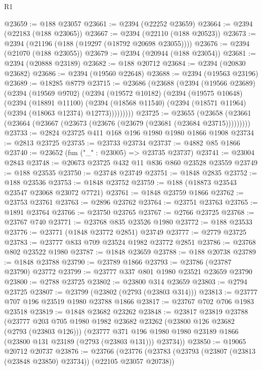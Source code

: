 \begin{lexlean}{R1}
\begin{coremodule}
@23659 := @188 @23057
@23661 := @2394 (@22252 @23659)
@23664 := @2394 (@22183 (@188 @23065))
@23667 := @2394 (@22110 (@188 @20523))
@23673 := @2394 (@21196 (@188 (@19297 (@18792 @20698 @23055))))
@23676 := @2394 (@21070 (@188 @23055))
@23679 := @2394 (@20944 (@188 @23054))
@23681 := @2394 (@20888 @23189)
@23682 := @188 @20712
@23684 := @2394 (@20830 @23682)
@23686 := @2394 (@19560 @22648)
@23688 := @2394 (@19563 @23196)
@23689 := @18285 @8779
@23715 := @23686
    (@23688
      (@2394
        (@19566 @23689)
        (@2394
          (@19569 @9702)
          (@2394
            (@19572 @10182)
            (@2394
              (@19575 @10648)
              (@2394
                (@18891 @11100)
                (@2394 (@18568 @11540) (@2394 (@18571 @11964) (@2394 (@18063 @12374) @12773)))))))))
@23725 := @23655
    (@23658 (@23661 (@23664 (@23667 (@23673 (@23676 (@23679 (@23681 (@23684 @23715)))))))))
@23733 := @2824 @23725 @411 @168 @196 @1980 @1980 @1866 @1908
@23734 := @2813 @23725
@23735 := @23733 @23734
@23737 := @4882 @85 @1866
@23740 := @23652 (fun ("_" : @23005) => @23735 @23737)
@23741 := @23004 @2843
@23748 := @20673 @23725 @432 @11 @836 @860 @23528 @23559
@23749 := @188 @23535
@23750 := @23748 @23749
@23751 := @1848 @2835
@23752 := @188 @23536
@23753 := @1848 @23752
@23759 := @188 (@18873 @23543 @23547 @23068 @23072 @7721)
@23761 := @1848 @23759 @1866
@23762 := @23753 @23761
@23763 := @2896 @23762
@23764 := @23751 @23763
@23765 := @1891 @23764
@23766 := @23750 @23765
@23767 := @2766 @23725
@23768 := @23767 @740
@23771 := @23768 @835 @23526 @1980
@23772 := @188 @23533
@23776 := @23771 (@1848 @23772 @2851) @23749
@23777 := @2779 @23725
@23783 := @23777 @833 @709 @23524 @1982 @23772 @2851
@23786 := @23768 @802 @23522 @1980
@23787 := @1848 @23659
@23788 := @188 @20738
@23789 := @1848 @23788
@23790 := @23789 @1866
@23793 := @23786 (@23787 @23790) @23772
@23799 := @23777 @337 @801 @1980 @23521 @23659 @23790
@23800 := @2788 @23725
@23802 := @23800 @314 @23659
@23803 := @2794 @23725
@23807 := @23799 (@23802 (@2793 (@23803 @314)))
@23813 := @23777 @707 @196 @23519 @1980 @23788 @1866
@23817 := @23767 @702 @706 @1983 @23518
@23819 := @1848 @23682 @23262
@23848 := @23817
    @23819
    @23788
    (@23777
      @203
      @705
      @1980
      @1982
      @23682
      @23262
      (@23800 @126 @23682 (@2793 (@23803 @126)))
      (@23777 @371 @196 @1980 @1980 @23189 @1866 (@23800 @131 @23189 (@2793 (@23803 @131))) @23734))
@23850 := @19065 @20712 @20737
@23876 := @23766
    (@23776
      (@23783
        (@23793 (@23807 (@23813 (@23848 @23850) @23734)) (@22105 @23057 @20738))

\end{coremodule}
\end{lexlean}
